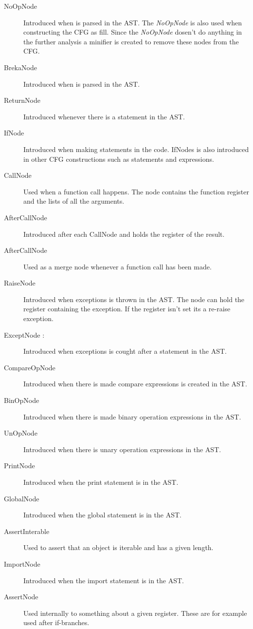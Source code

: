 \begin{description}
	\item[NoOpNode ] Introduced when  is parsed in the AST. The \textit{NoOpNode} is also used when constructing the CFG as fill. Since the \textit{NoOpNode} dosen't do anything in the further analysis a minifier is created to remove these nodes from the CFG.
	\item[BrekaNode ] Introduced when  is parsed in the AST.
	\item[ReturnNode ] Introduced whenever there is a  statement in the AST. 
	\item[IfNode ] Introduced when making  statements in the code. IfNodes is also introduced in other CFG constructions such as  statements and  expressions.
	\item[CallNode ] Used when a function call happens. The node contains the function register and the lists of all the arguments.
	\item[AfterCallNode] Introduced after each CallNode and holds the register of the result.
	\item[AfterCallNode] Used as a merge node whenever a function call has been made.
	\item[RaiseNode ] Introduced when exceptions is thrown in the AST. The node can hold the register containing the exception. If the register isn't set its a re-raise exception.
	\item[ExceptNode :] Introduced when exceptions is cought after a  statement in the AST.
	\item[CompareOpNode ] Introduced when there is made compare expressions is created in the AST.
	\item[BinOpNode ] Introduced when there is made binary operation expressions in the AST.
	\item[UnOpNode ] Introduced when there is unary operation expressions in the AST.
	\item[PrintNode ] Introduced when the print statement is in the AST.
	\item[GlobalNode ] Introduced when the global statement is in the AST.
	\item[AssertInterable] Used to assert that an object is iterable and has a given length.
	\item[ImportNode ] Introduced when the import statement is in the AST.
	\item[AssertNode] Used internally to something about a given register. These are for example used after if-branches.
	
\end{description}